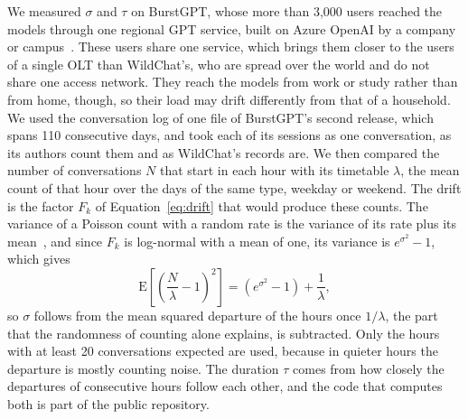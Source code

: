 \documentclass[cic,dipl,english]{infufrgs}
\begin{document}
We measured $\sigma$ and $\tau$ on BurstGPT, whose more than 3,000 users reached the
models through one regional GPT service, built on Azure OpenAI by a company or
campus~\cite{wang2025burstgpt}. These users share one service, which brings them
closer to the users of a single OLT than WildChat's, who are spread over the world and do
not share one access network. They reach the models from work or study rather than from
home, though, so their load may drift differently from that of a household. We used the
conversation log of one file of BurstGPT's second release, which spans 110 consecutive
days, and took each of its sessions as one conversation, as its authors
count them and as WildChat's records are. We then compared the number of conversations $N$
that start in each hour with its timetable $\lambda$, the mean count of that hour over the
days of the same type, weekday or weekend. The drift is the factor $F_k$ of
Equation~\eqref{eq:drift} that would produce these counts. The variance of a Poisson count
with a random rate is the variance of its rate plus its mean~\cite{ibrahim2012modeling}, and since
$F_k$ is log-normal with a mean of one, its variance is $e^{\sigma^2} - 1$, which gives
\begin{equation}
  \mathrm{E}\!\left[\left(\frac{N}{\lambda} - 1\right)^{2}\right] = \left(e^{\sigma^2} - 1\right) + \frac{1}{\lambda},
  \label{eq:drift-size}
\end{equation}
so $\sigma$ follows from the mean squared departure of the hours once $1/\lambda$, the part
that the randomness of counting alone explains, is subtracted. Only the hours with at least
20 conversations expected are used, because in quieter hours the departure is mostly
counting noise. The duration
$\tau$ comes from how closely the departures of consecutive hours follow each other, and
the code that computes both is part of the public repository.
\end{document}
